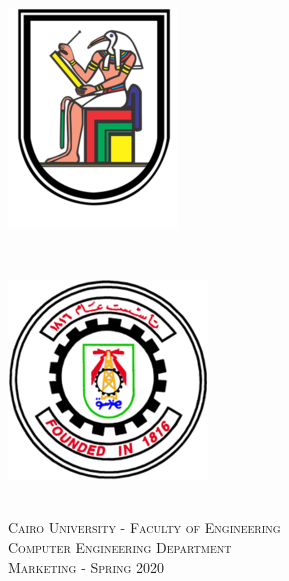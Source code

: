 \documentclass[a4paper,12pt]{article}
\begin{document}
\begin{titlepage}
\newcommand{\HRule}{\rule{\linewidth}{0.5mm}} %
\setlength{\topmargin}{0in}
\center %
 
 \begin{minipage}{0.4\textwidth}
\begin{flushleft} \large
\hspace*{-0.5cm}
\includegraphics[scale=4]{images/uni_logo.png}\\
\end{flushleft}
\end{minipage}
~
\begin{minipage}{0.5\textwidth}
\begin{flushright} \large
\hspace*{2cm}
\includegraphics[scale=0.6]{images/fac_logo.png}\\
\end{flushright}
\end{minipage}\\[1cm]

\textsc{\Large Cairo University - Faculty of Engineering}\\[0.5cm] %
\textsc{Computer Engineering Department} \\[0.5cm] 
\textsc{Marketing - Spring 2020} \\[0.5cm] 
\textsc{\large }\\[0.5cm] %


\end{titlepage}
\end{document}
